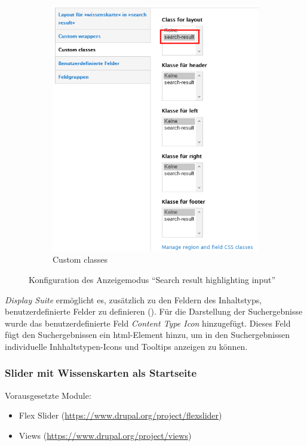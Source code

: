 \begin{figure}[H]
\begin{subfigure}[b]{0.30\textwidth}
		\includegraphics[width=\linewidth]{images/config_searchresult_viewmodesearchclass}
		\caption[]{Custom classes}
		\label{fig:config_searchresult_viewmodesearchclass}
	\end{subfigure}
	\caption{Konfiguration des Anzeigemodus \enquote{Search result highlighting input}}
	\label{fig:config_searchresult}
\end{figure}


\textit{Display Suite} ermöglicht es, zusätzlich zu den Feldern des Inhaltstyps, benutzerdefinierte Felder zu definieren (). Für die Darstellung der Suchergebnisse wurde \zB das benutzerdefinierte Feld \textit{Content Type Icon} hinzugefügt. Dieses Feld fügt den Suchergebnissen ein html-Element hinzu, um in den Suchergebnissen individuelle Inhhaltstypen-Icons und Tooltips anzeigen zu können.




\newpage
\subsubsection{Slider mit Wissenskarten als Startseite}\label{subsub:wkslider}
Vorausgesetzte Module:
\begin{itemize}
	\item Flex Slider (\url{https://www.drupal.org/project/flexslider})
	\item Views (\url{https://www.drupal.org/project/views})
\end{itemize}


